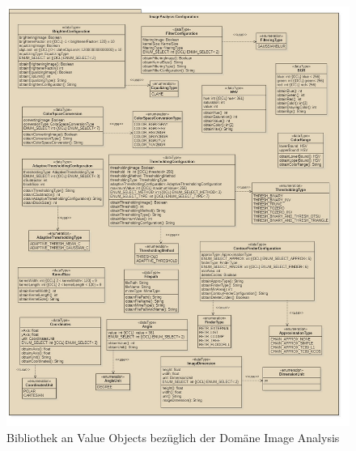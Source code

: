 \begin{figure}[H]
	\center
	\includegraphics[scale=0.34]{Grafiken/modelle/vo-imageanalysis.jpg}
	\caption{Bibliothek an Value Objects bezüglich der Domäne \glqq{}Image Analysis\grqq{}}
	\label{fig: Bibliothek an Value Objects bezüglich der Domäne Image Analysis}
\end{figure}


